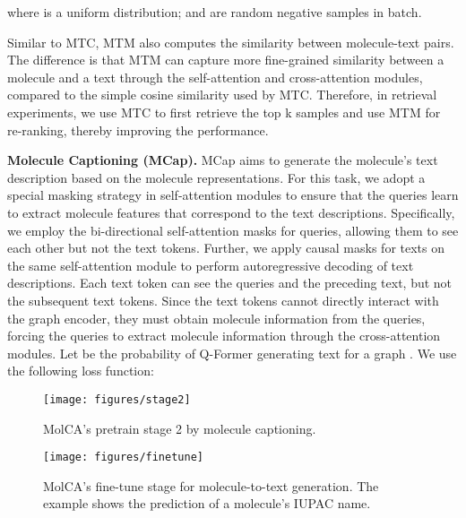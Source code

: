 \documentclass[11pt]{article}
\begin{document}
where  is a uniform distribution;  and  are random negative samples in batch.

Similar to MTC, MTM also computes the similarity between molecule-text pairs. The difference is that MTM can capture more fine-grained similarity between a molecule and a text through the self-attention and cross-attention modules, compared to the simple cosine similarity used by MTC. Therefore, in retrieval experiments, we use MTC to first retrieve the top k samples and use MTM for re-ranking, thereby improving the performance.


\textbf{Molecule Captioning (MCap).} MCap aims to generate the molecule's text description based on the molecule representations. For this task, we adopt a special masking strategy in self-attention modules to ensure that the queries learn to extract molecule features that correspond to the text descriptions. Specifically, we employ the bi-directional self-attention masks for queries, allowing them to see each other but not the text tokens. Further, we apply causal masks for texts on the same self-attention module to perform autoregressive decoding of text descriptions. Each text token can see the queries and the preceding text, but not the subsequent text tokens. Since the text tokens cannot directly interact with the graph encoder, they must obtain molecule information from the queries, forcing the queries to extract molecule information through the cross-attention modules. Let  be the probability of Q-Former generating text  for a graph . We use the following loss function:





\begin{figure*}[t]
\centering
\begin{minipage}{.3\textwidth}
\centering
\texttt{[image: figures/stage2]}
\caption{MolCA's pretrain stage 2 by molecule captioning.}
\label{fig:stage2}
\end{minipage}
\hspace{5pt}
\begin{minipage}{.566\textwidth}
\centering
\texttt{[image: figures/finetune]}
\caption{MolCA's fine-tune stage for molecule-to-text generation. The example shows the prediction of a molecule's IUPAC name.}
\label{fig:finetune}
\end{minipage}
 \vspace{-4mm}
\end{figure*}
\end{document}
